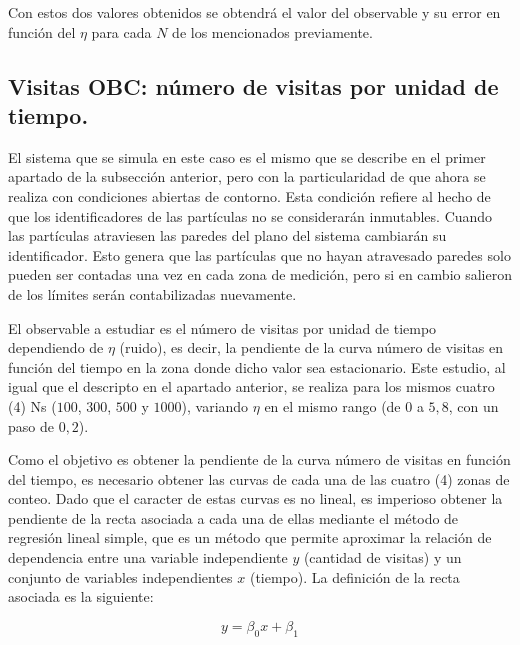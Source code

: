 \documentclass[11pt, a4paper]{article}
\begin{document}
            Con estos dos valores obtenidos se obtendrá el valor del observable y su error en función del $\eta$ para cada $N$ de los mencionados previamente.

        \subsection{Visitas OBC: número de visitas por unidad de tiempo.}
        \label{subsec:visitas-obc}

            El sistema que se simula en este caso es el mismo que se describe en el primer apartado de la subsección
            anterior, pero con la particularidad de que ahora se realiza con condiciones abiertas de contorno.
            Esta condición refiere al hecho de que los identificadores de las partículas no se considerarán inmutables.
            Cuando las partículas atraviesen las paredes del plano del sistema cambiarán su identificador. Esto genera
            que las partículas que no hayan atravesado paredes solo pueden ser contadas una vez en cada zona de medición,
            pero si en cambio salieron de los límites serán contabilizadas nuevamente.

            El observable a estudiar es el número de visitas por unidad de tiempo dependiendo de $\eta$ (ruido), es decir,
            la pendiente de la curva número de visitas en función del tiempo en la zona donde dicho valor sea estacionario.
            Este estudio, al igual que el descripto en el apartado anterior, se realiza para los mismos cuatro (4) Ns
            ($100$, $300$, $500$ y $1000$), variando $\eta$ en el mismo rango (de $0$ a $5,8$, con un paso de $0,2$).

            Como el objetivo es obtener la pendiente de la curva número de visitas en función del tiempo, es necesario obtener las curvas
            de cada una de las cuatro (4) zonas de conteo.
            Dado que el caracter de estas curvas es no lineal, es imperioso obtener la pendiente de la recta asociada
            a cada una de ellas mediante el método de regresión lineal simple, que es un método que permite aproximar
            la relación de dependencia entre una variable independiente $y$ (cantidad de visitas) y un conjunto de
            variables independientes $x$ (tiempo).
            La definición de la recta asociada es la siguiente:

            \begin{equation}
                y = \beta_0 x + \beta_1
            \end{equation}
\end{document}
